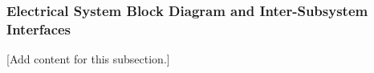 
\subsubsection{Electrical System Block Diagram and Inter-Subsystem Interfaces}
\label{subsubsec:design_2_2_electrical_block_diagram_interfaces}

[Add content for this subsection.]
